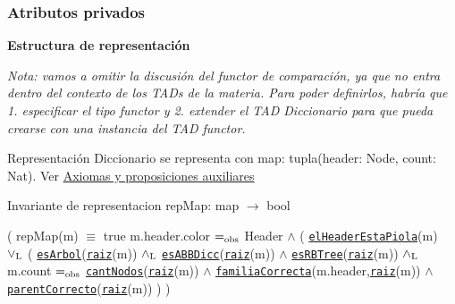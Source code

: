 \subsubsection*{Atributos privados}
\begin{Indent}{\bf Estructura de representación}\par
{\em Nota\-: vamos a omitir la discusión del functor de comparación, ya que no entra dentro del contexto de los T\-A\-Ds de la materia. Para poder definirlos, habría que 1. especificar el tipo functor y 2. extender el T\-A\-D Diccionario para que pueda crearse con una instancia del T\-A\-D functor.

\begin{DoxyParagraph}{Representación}
Diccionario se representa con map\-: tupla(header\-: Node, count\-: Nat). Ver \hyperlink{axiomas}{Axiomas y proposiciones auxiliares}
\end{DoxyParagraph}
\begin{DoxyParagraph}{Invariante de representacion}
rep\-Map\-: map $\to$ bool\par
( rep\-Map(m) $\equiv$ true  m.\-header.\-color $=_{\rm obs}$ Header $\land$ ( \href{axiomas.html#elHeaderEstaPiola}{\tt el\-Header\-Esta\-Piola}(m) $\lor_{\rm L}$ ( \href{axiomas.html#esArbol}{\tt es\-Arbol}(\href{axiomas.html#raiz}{\tt raiz}(m)) $\land_{\rm L}$ \href{axiomas.html#esABBDicc}{\tt es\-A\-B\-B\-Dicc}(\href{axiomas.html#raiz}{\tt raiz}(m)) $\land$ \href{axiomas.html#esRBTree}{\tt es\-R\-B\-Tree}(\href{axiomas.html#raiz}{\tt raiz}(m)) $\land_{\rm L}$ m.\-count $=_{\rm obs}$ \href{axiomas.html#cantNodos}{\tt cant\-Nodos}(\href{axiomas.html#raiz}{\tt raiz}(m)) $\land$ \href{axiomas.html#familiaCorrecta}{\tt familia\-Correcta}(m.\-header,\href{axiomas.html#raiz}{\tt raiz}(m)) $\land$ \href{axiomas.html#parentCorrecto}{\tt parent\-Correcto}(\href{axiomas.html#raiz}{\tt raiz}(m)) ) ) 
\end{DoxyParagraph}


}
\end{Indent}
